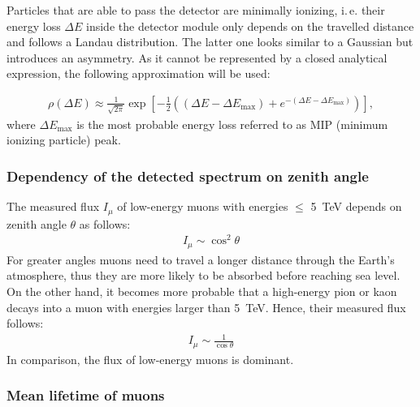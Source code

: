 Particles that are able to pass the detector are minimally ionizing, i.\,e. their energy loss $\Delta E$ inside the detector module only depends on the travelled distance and follows a Landau distribution.
The latter one looks similar to a Gaussian but introduces an asymmetry.
As it cannot be represented by a closed analytical expression, the following approximation \cite{landau} will be used:

\begin{align}
	\rho(\Delta E)\approx \frac{1}{\sqrt{2\pi}}\exp\left[ -\frac{1}{2}\left( \left(\Delta E-\Delta E_\text{max} \right) +e^{-\left(\Delta E-\Delta E_\text{max} \right)}\right) \right] ,
\end{align} 
where $\Delta E_\text{max}$ is the most probable energy loss referred to as MIP (minimum ionizing particle) peak.

\subsubsection{Dependency of the detected spectrum on zenith angle}

The measured flux $I_\mu$ of low-energy muons with energies $\leq$ \SI{5}{\tera\electronvolt} depends on zenith angle $\theta$ as follows:
\begin{align}
	I_\mu \sim \cos^2\theta
\end{align}
For greater angles muons need to travel a longer distance through the Earth's atmosphere, thus they are more likely to be absorbed before reaching sea level.
On the other hand, it becomes more probable that a high-energy pion or kaon decays into a muon with energies larger than \SI{5}{\tera\electronvolt}.
Hence, their measured flux follows:
\begin{align}
	I_\mu \sim \frac{1}{\cos\theta}
\end{align}
In comparison, the flux of low-energy muons is dominant.

\subsubsection{Mean lifetime of muons}

